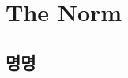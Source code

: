 \documentclass{42-ko}
\begin{document}
\newpage

\chapter{The Norm}


    \section{명명}
\end{document}
